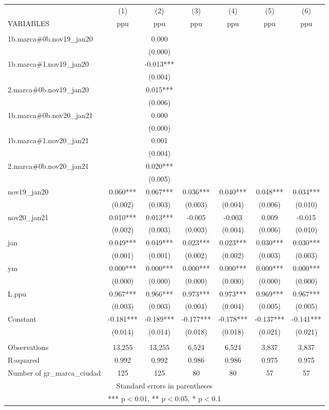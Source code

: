 \begin{tabular}{lcccccc} \hline
 & (1) & (2) & (3) & (4) & (5) & (6) \\
VARIABLES & ppu & ppu & ppu & ppu & ppu & ppu \\ \hline
 &  &  &  &  &  &  \\
1b.marca\#0b.nov19\_jan20 &  & 0.000 &  &  &  &  \\
 &  & (0.000) &  &  &  &  \\
1b.marca\#1.nov19\_jan20 &  & -0.013*** &  &  &  &  \\
 &  & (0.004) &  &  &  &  \\
2.marca\#0b.nov19\_jan20 &  & 0.015*** &  &  &  &  \\
 &  & (0.006) &  &  &  &  \\
1b.marca\#0b.nov20\_jan21 &  & 0.000 &  &  &  &  \\
 &  & (0.000) &  &  &  &  \\
1b.marca\#1.nov20\_jan21 &  & 0.001 &  &  &  &  \\
 &  & (0.004) &  &  &  &  \\
2.marca\#0b.nov20\_jan21 &  & 0.020*** &  &  &  &  \\
 &  & (0.005) &  &  &  &  \\
nov19\_jan20 & 0.060*** & 0.067*** & 0.036*** & 0.040*** & 0.048*** & 0.034*** \\
 & (0.002) & (0.003) & (0.003) & (0.004) & (0.006) & (0.010) \\
nov20\_jan21 & 0.010*** & 0.013*** & -0.005 & -0.003 & 0.009 & -0.015 \\
 & (0.002) & (0.003) & (0.003) & (0.004) & (0.006) & (0.010) \\
jan & 0.049*** & 0.049*** & 0.023*** & 0.023*** & 0.030*** & 0.030*** \\
 & (0.001) & (0.001) & (0.002) & (0.002) & (0.003) & (0.003) \\
ym & 0.000*** & 0.000*** & 0.000*** & 0.000*** & 0.000*** & 0.000*** \\
 & (0.000) & (0.000) & (0.000) & (0.000) & (0.000) & (0.000) \\
L.ppu & 0.967*** & 0.966*** & 0.973*** & 0.973*** & 0.969*** & 0.967*** \\
 & (0.003) & (0.003) & (0.004) & (0.004) & (0.005) & (0.005) \\
Constant & -0.181*** & -0.189*** & -0.177*** & -0.178*** & -0.137*** & -0.141*** \\
 & (0.014) & (0.014) & (0.018) & (0.018) & (0.021) & (0.021) \\
 &  &  &  &  &  &  \\
Observations & 13,255 & 13,255 & 6,524 & 6,524 & 3,837 & 3,837 \\
R-squared & 0.992 & 0.992 & 0.986 & 0.986 & 0.975 & 0.975 \\
 Number of gr\_marca\_ciudad & 125 & 125 & 80 & 80 & 57 & 57 \\ \hline
\multicolumn{7}{c}{ Standard errors in parentheses} \\
\multicolumn{7}{c}{ *** p$<$0.01, ** p$<$0.05, * p$<$0.1} \\
\end{tabular}
